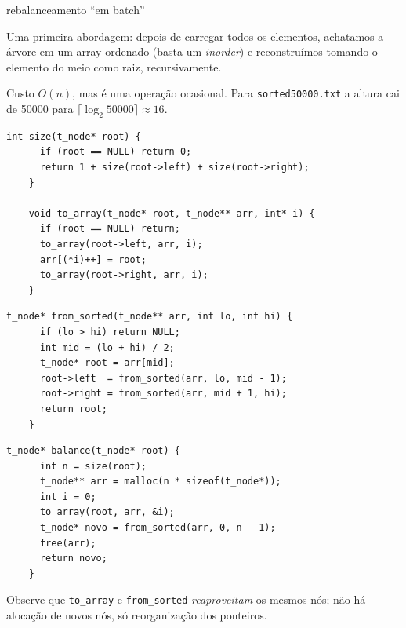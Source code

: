 \documentclass{beamer}
\begin{document}
\begin{frame}{rebalanceamento ``em batch''}

  Uma primeira abordagem: depois de carregar todos os elementos,
  achatamos a árvore em um array ordenado (basta um \emph{inorder}) e
  reconstruímos tomando o elemento do meio como raiz, recursivamente.

  Custo $O(n)$, mas é uma operação ocasional. Para
  \texttt{sorted50000.txt} a altura cai de 50000 para
  $\lceil \log_2 50000 \rceil \approx 16$.

  \framebreak

  \begin{lstlisting}[style=normalc,caption=tree.c]
    int size(t_node* root) {
      if (root == NULL) return 0;
      return 1 + size(root->left) + size(root->right);
    }

    void to_array(t_node* root, t_node** arr, int* i) {
      if (root == NULL) return;
      to_array(root->left, arr, i);
      arr[(*i)++] = root;
      to_array(root->right, arr, i);
    }
  \end{lstlisting}

  \framebreak

  \begin{lstlisting}[style=normalc,caption=tree.c]
    t_node* from_sorted(t_node** arr, int lo, int hi) {
      if (lo > hi) return NULL;
      int mid = (lo + hi) / 2;
      t_node* root = arr[mid];
      root->left  = from_sorted(arr, lo, mid - 1);
      root->right = from_sorted(arr, mid + 1, hi);
      return root;
    }
  \end{lstlisting}

  \framebreak

  \begin{lstlisting}[style=normalc,caption=tree.c]
    t_node* balance(t_node* root) {
      int n = size(root);
      t_node** arr = malloc(n * sizeof(t_node*));
      int i = 0;
      to_array(root, arr, &i);
      t_node* novo = from_sorted(arr, 0, n - 1);
      free(arr);
      return novo;
    }
  \end{lstlisting}

  Observe que \texttt{to\_array} e \texttt{from\_sorted}
  \emph{reaproveitam} os mesmos nós; não há alocação de novos nós, só
  reorganização dos ponteiros.

\end{frame}
\end{document}
